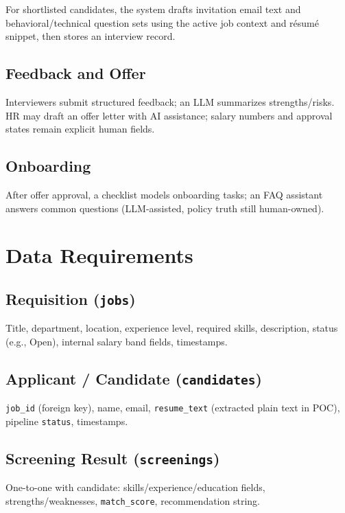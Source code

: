 \documentclass[12pt]{article}
\begin{document}
For shortlisted candidates, the system drafts invitation email text and behavioral/technical question sets using the active job context and résumé snippet, then stores an interview record.

\subsection{Feedback and Offer}

Interviewers submit structured feedback; an LLM summarizes strengths/risks. HR may draft an offer letter with AI assistance; salary numbers and approval states remain explicit human fields.

\subsection{Onboarding}

After offer approval, a checklist models onboarding tasks; an FAQ assistant answers common questions (LLM-assisted, policy truth still human-owned).

\section{Data Requirements}
\label{sec:datareq}

\subsection{Requisition (\texttt{jobs})}

Title, department, location, experience level, required skills, description, status (e.g., Open), internal salary band fields, timestamps.

\subsection{Applicant / Candidate (\texttt{candidates})}

\texttt{job\_id} (foreign key), name, email, \texttt{resume\_text} (extracted plain text in POC), pipeline \texttt{status}, timestamps.

\subsection{Screening Result (\texttt{screenings})}

One-to-one with candidate: skills/experience/education fields, strengths/weaknesses, \texttt{match\_score}, recommendation string.
\end{document}
